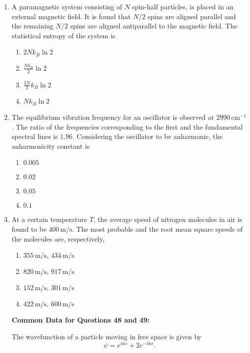 \documentclass[article]{IEEEtran}
\numberwithin{figure}{enumi}
\begin{document}
\begin{enumerate}
    \item A paramagnetic system consisting of $N$ spin-half particles, is placed in an external magnetic field. It is found that $N/2$ spins are aligned parallel and the remaining $N/2$ spins are aligned antiparallel to the magnetic field. The statistical entropy of the system is
    \begin{enumerate}
        \item $2 N k_B \ln 2$
        \item $\frac{N k_B}{2} \ln 2$
        \item $\frac{3 N}{2} k_B \ln 2$
        \item $N k_B \ln 2$
    \end{enumerate}

    \item The equilibrium vibration frequency for an oscillator is observed at $2990 \, \text{cm}^{-1}$. The ratio of the frequencies corresponding to the first and the fundamental spectral lines is $1.96$. Considering the oscillator to be anharmonic, the anharmonicity constant is
    \begin{enumerate}
        \item $0.005$
        \item $0.02$
        \item $0.05$
        \item $0.1$
    \end{enumerate}

    \item At a certain temperature $T$, the average speed of nitrogen molecules in air is found to be $400 \, \text{m/s}$. The most probable and the root mean square speeds of the molecules are, respectively,
    \begin{enumerate}
        \item $355 \, \text{m/s}, \, 434 \, \text{m/s}$
        \item $820 \, \text{m/s}, \, 917 \, \text{m/s}$
        \item $152 \, \text{m/s}, \, 301 \, \text{m/s}$
        \item $422 \, \text{m/s}, \, 600 \, \text{m/s}$
    \end{enumerate}
\raggedright
\textbf{Common Data for Questions 48 and 49:}

    The wavefunction of a particle moving in free space is given by
    \begin{equation*}
    \psi = e^{ikx} + 2e^{-ikx}.
    \end{equation*}



\end{enumerate}
\end{document}
